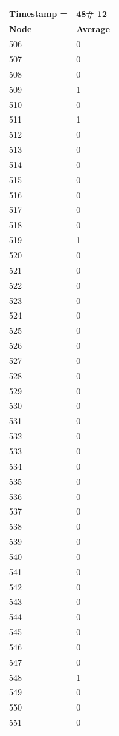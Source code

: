 \begin{tabular}{|l||l|}
\hline
\textbf{Timestamp =} & \textbf{48}\# 12\\\hline
	\textbf{Node} & \textbf{Average} \\ \hline
\hline
	506 & 0 \\ \hline
	507 & 0 \\ \hline
	508 & 0 \\ \hline
	509 & 1 \\ \hline
	510 & 0 \\ \hline
	511 & 1 \\ \hline
	512 & 0 \\ \hline
	513 & 0 \\ \hline
	514 & 0 \\ \hline
	515 & 0 \\ \hline
	516 & 0 \\ \hline
	517 & 0 \\ \hline
	518 & 0 \\ \hline
	519 & 1 \\ \hline
	520 & 0 \\ \hline
	521 & 0 \\ \hline
	522 & 0 \\ \hline
	523 & 0 \\ \hline
	524 & 0 \\ \hline
	525 & 0 \\ \hline
	526 & 0 \\ \hline
	527 & 0 \\ \hline
	528 & 0 \\ \hline
	529 & 0 \\ \hline
	530 & 0 \\ \hline
	531 & 0 \\ \hline
	532 & 0 \\ \hline
	533 & 0 \\ \hline
	534 & 0 \\ \hline
	535 & 0 \\ \hline
	536 & 0 \\ \hline
	537 & 0 \\ \hline
	538 & 0 \\ \hline
	539 & 0 \\ \hline
	540 & 0 \\ \hline
	541 & 0 \\ \hline
	542 & 0 \\ \hline
	543 & 0 \\ \hline
	544 & 0 \\ \hline
	545 & 0 \\ \hline
	546 & 0 \\ \hline
	547 & 0 \\ \hline
	548 & 1 \\ \hline
	549 & 0 \\ \hline
	550 & 0 \\ \hline
	551 & 0 \\ \hline
\end{tabular}

